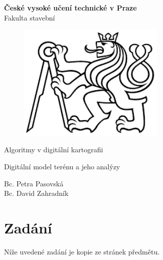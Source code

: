 \documentclass[a4paper, 12pt]{article}
\begin{document}
\begin{titlepage}
\begin{center}
\noindent
\Large \textbf{České vysoké učení technické v Praze }\\ Fakulta stavební
\vspace{5cm}

\huge

\begin{figure}[h!]
	\centering
	\includegraphics[width=7cm]{pictures/logo.png}
\end{figure}

\vspace{0.5cm}

Algoritmy v digitální kartografii \\

\vspace{3cm}

\Huge  
Digitální model terénu a jeho analýzy\\

\vspace{2cm}

\Large
Bc. Petra Pasovská \\
Bc. David Zahradník \\

\end{center}

\end{titlepage}




\pagestyle{plain}     %
\setcounter{page}{1}  %

\tableofcontents
\newpage

\section{Zadání}
Níže uvedené zadání je kopie ze stránek předmětu. 
\end{document}
